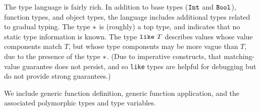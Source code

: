 \documentclass{article}
\newcommand{\Int}{\t{Int}}
\newcommand{\Bool}{\t{Bool}}
\newcommand{\dynamic}{\t{*}}
\renewcommand{\t}[1]{{\tt #1}}
\newcommand{\wrapty}[1]{\t{wrap}~#1}
\newcommand{\likety}[1]{\t{like}~#1}
\begin{document}
The type language is fairly rich. In addition to  base types ($\Int$ and $\Bool$), function types,
and object types, the language includes additional types related to gradual typing.
The type $\dynamic$ is (roughly) a top type, and indicates that no static type information is known.
The type $\likety{T}$ describes values whose value components match $T$, but whose type components may be more vague than $T$, due to the presence of the type $\dynamic$. (Due to imperative constructs, that matching-value guarantee does not persist, and so \t{like} types are helpful for debugging but do not provide strong guarantees.)

We include generic function definition, generic function application, and the associated polymorphic types and type variables.

\end{document}
